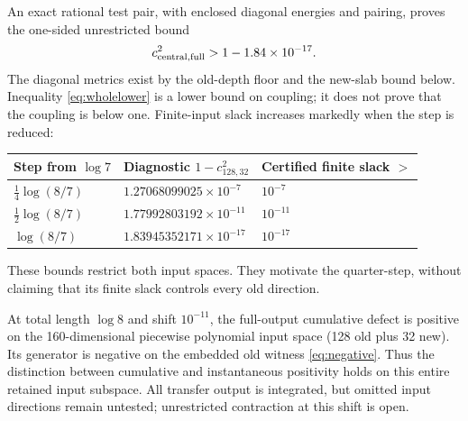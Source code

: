 \documentclass[11pt]{article}
\theoremstyle{remark}\newtheorem{remark}[theorem]{Remark}
\begin{document}
An exact rational test pair, with enclosed diagonal energies and pairing, proves the one-sided unrestricted bound
\begin{equation}\label{eq:wholelower}
 c_{\rm central,full}^2>1-1.84\times10^{-17}.
\end{equation}
The diagonal metrics exist by the old-depth floor and the new-slab bound below. Inequality \eqref{eq:wholelower} is a lower bound on coupling; it does not prove that the coupling is below one. Finite-input slack increases markedly when the step is reduced:
\begin{center}
\begin{tabular}{@{}lll@{}}\toprule
Step from $\log7$ & Diagnostic $1-c_{128,32}^2$ & Certified finite slack $>$\\\midrule
$\tfrac14\log(8/7)$ & $1.27068099025\times10^{-7}$ & $10^{-7}$\\
$\tfrac12\log(8/7)$ & $1.77992803192\times10^{-11}$ & $10^{-11}$\\
$\log(8/7)$ & $1.83945352171\times10^{-17}$ & $10^{-17}$\\\bottomrule
\end{tabular}
\end{center}
These bounds restrict both input spaces. They motivate the quarter-step, without claiming that its finite slack controls every old direction.

At total length $\log8$ and shift $10^{-11}$, the full-output cumulative defect is positive on the 160-dimensional piecewise polynomial input space (128 old plus 32 new). Its generator is negative on the embedded old witness \eqref{eq:negative}. Thus the distinction between cumulative and instantaneous positivity holds on this entire retained input subspace. All transfer output is integrated, but omitted input directions remain untested; unrestricted contraction at this shift is open.
\end{document}
